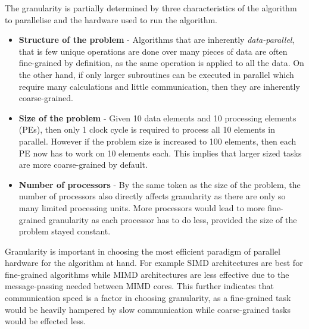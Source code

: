 \documentclass[CS4204-Notes.tex]{subfiles}
\begin{document}
\noindent
The granularity is partially determined by three characteristics of the algorithm to parallelise and the hardware used to run the algorithm.
\begin{itemize}
\item \textbf{Structure of the problem} - Algorithms that are inherently \textit{data-parallel}, that is few unique operations are done over many pieces of data are often fine-grained by definition, as the same operation is applied to all the data. On the other hand, if only larger subroutines can be executed in parallel which require many calculations and little communication, then they are inherently coarse-grained. 
\item \textbf{Size of the problem} - Given 10 data elements and 10 processing elements (PEs), then only 1 clock cycle is required to process all 10 elements in parallel. However if the problem size is increased to 100 elements, then each PE now has to work on 10 elements each. This implies that larger sized tasks are more coarse-grained by default.
\item \textbf{Number of processors} - By the same token as the size of the problem, the number of processors also directly affects granularity as there are only so many limited processing units. More processors would lead to more fine-grained granularity as each processor has to do less, provided the size of the problem stayed constant. 
\end{itemize}
Granularity is important in choosing the most efficient paradigm of parallel hardware for the algorithm at hand. For example SIMD architectures are best for fine-grained algorithms while MIMD architectures are less effective due to the message-passing needed between MIMD cores. This further indicates that communication speed is a factor in choosing granularity, as a fine-grained task would be heavily hampered by slow communication while coarse-grained tasks would be effected less. 
\end{document}
